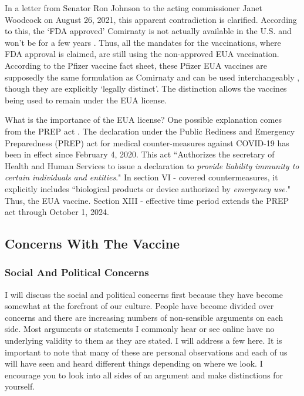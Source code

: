 \documentclass[10pt, a4paper, twocolumn]{book}
\begin{document}
In a letter from Senator Ron Johnson to the acting commissioner Janet Woodcock on August 26, 2021, this apparent contradiction is clarified. According to this, the `FDA approved' Comirnaty is not actually available in the U.S. and won't be for a few years \citep{SenatorRonJonsonLetterToFDA}. Thus, all the mandates for the vaccinations, where FDA approval is claimed, are still using the non-approved EUA vaccination. According to the Pfizer vaccine fact sheet, these Pfizer EUA vaccines are supposedly the same formulation as Comirnaty and can be used interchangeably \citep{PfizerFactSheet}, though they are explicitly `legally distinct'. The distinction allows the vaccines being used to remain under the EUA license. 

What is the importance of the EUA license? One possible explanation comes from the PREP act \citep{PREPAct}. The declaration under the Public Rediness and Emergency Preparedness (PREP) act for medical counter-measures against COVID-19 has been in effect since February 4, 2020. This act ``Authorizes the secretary of Health and Human Services to issue a declaration to\textit{ provide liability immunity to certain individuals and entities}." In section VI - covered countermeasures, it explicitly includes ``biological products or device authorized by \textit{emergency use}." Thus, the EUA vaccine. Section XIII - effective time period extends the PREP act through October 1, 2024.



\subsection{Concerns With The Vaccine}
\subsubsection{Social And Political Concerns}

I will discuss the social and political concerns first because they have become somewhat at the forefront of our culture. People have become divided over concerns and there are increasing numbers of non-sensible arguments on each side. Most arguments or statements I commonly hear or see online have no underlying validity to them as they are stated. I will address a few here. It is important to note that many of these are personal observations and each of us will have seen and heard different things depending on where we look. I encourage you to look into all sides of an argument and make distinctions for yourself.
\end{document}
